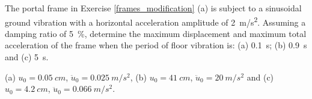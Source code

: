 
\begin{Exercise}[label={frame_ground_acceleration}]
The portal frame in Exercise \ref{frames_modification} (a) is subject to a sinusoidal ground vibration with a horizontal acceleration amplitude of \SI{2}{m/s^2}. Assuming a damping ratio of \SI{5}{\%}, determine the maximum displacement and maximum total acceleration of the frame when the period of floor vibration is: (a) \SI{0.1}{s}; (b) \SI{0.9}{s} and (c) \SI{5}{s}.

\begin{center}
\end{center}

\shortAnswer (a) $u_0 = \SI{0.05}{cm}$, $\ddot{u}_0 = \SI{0.025}{m/s^2}$, (b) $u_0 = \SI{41}{cm}$, $\ddot{u}_0 = \SI{20}{m/s^2}$ and (c) $u_0 = \SI{4.2}{cm}$, $\ddot{u}_0 = \SI{0.066}{m/s^2}$.
\end{Exercise}



